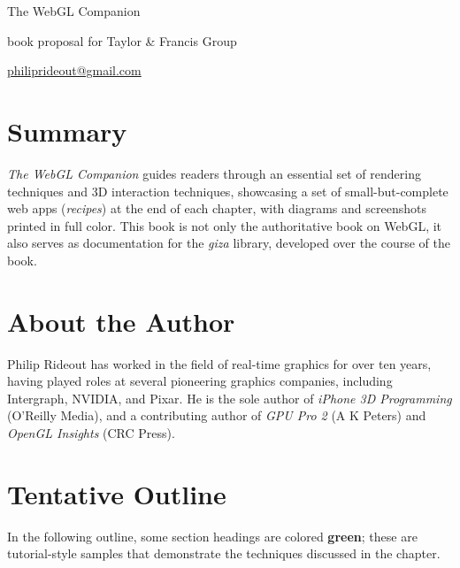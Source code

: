 \thispagestyle{empty}
\label{Proposal}
\LARGE

\noindent The WebGL Companion

\small

\vspace{0.25in}
\noindent book proposal for Taylor \& Francis Group

\noindent \href{mailto:philiprideout@gmail.com}{philiprideout@gmail.com}
\normalsize

\section*{Summary}
\emph{The WebGL Companion} guides readers through an essential set of rendering techniques and 3D interaction techniques, showcasing a set of small-but-complete web apps (\emph{recipes}) at the end of each chapter, with diagrams and screenshots printed in full color.  This book is not only the authoritative book on WebGL, it also serves as documentation for the \emph{giza} library, developed over the course of the book.

\section*{About the Author}

Philip Rideout has worked in the field of real-time graphics for over ten years, having played roles at several pioneering graphics companies, including Intergraph, NVIDIA, and Pixar.  He is the sole author of \emph{iPhone 3D Programming} (O'Reilly Media), and a contributing author of \emph{GPU Pro 2} (A K Peters) and \emph{OpenGL Insights} (CRC Press).

\section*{Tentative Outline}


In the following outline, some section headings are colored \textbf{\textcolor{mygreen}{green}}; these are tutorial-style samples that demonstrate the techniques discussed in the chapter.

\newcommand{\rrecipe}[1] {\section{\textcolor{mygreen}{#1} } }
\hypersetup{colorlinks,linkcolor=black}
\newcommand{\summary}[1]{\addtocontents{toc}{\setlength{\leftskip}{15pt} \noindent  \footnotesize\textcolor{mygray}{#1}\normalsize\protect\par}}

